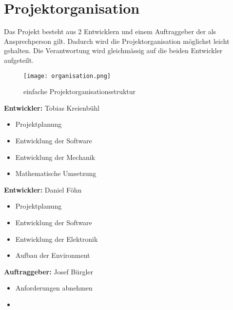 \section{Projektorganisation}
    Das Projekt besteht aus 2 Entwicklern und einem Auftraggeber der als Ansprechperson gilt. Dadurch wird die Projektorganisation möglichst leicht gehalten. Die Verantwortung wird gleichmässig auf die beiden Entwickler aufgeteilt.
    \begin{figure}[H]
        \centering
        \texttt{[image: organisation.png]}
        \caption{einfache Projektorganisationsstruktur}
    \end{figure}
	\textbf{Entwickler:} Tobias Kreienbühl
    \begin{itemize}
        \item Projektplanung
        \item Entwicklung der Software
        \item Entwicklung der Mechanik
        \item Mathematische Umsetzung
    \end{itemize}
    \vspace{.5cm}
    \textbf{Entwickler:} Daniel Föhn
    \begin{itemize}
        \item Projektplanung
        \item Entwicklung der Software
        \item Entwicklung der Elektronik
        \item Aufbau der Environment
    \end{itemize}
    \vspace{.5cm}
    \textbf{Auftraggeber:} Josef Bürgler
    \begin{itemize}
        \item Anforderungen abnehmen
        \item 
    \end{itemize}